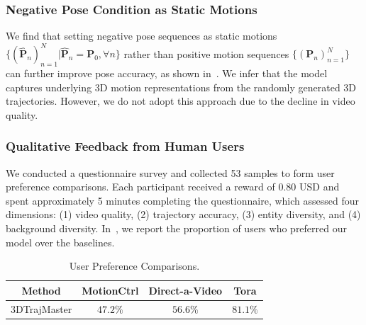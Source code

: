 



\subsubsection{Negative Pose Condition as Static Motions} \label{subsec:negpose}

We find that setting negative pose sequences as static motions $\{(\hat{\mathbf{P}}_n)_{n=1}^N|\hat{\mathbf{P}}_n=\mathbf{P}_0,\forall n\}$ rather than positive motion sequences $\{(\mathbf{P}_n)_{n=1}^N\}$ can further improve pose accuracy, as shown in~. We infer that the model captures underlying 3D motion representations from the randomly generated 3D trajectories. However, we do not adopt this approach due to the decline in video quality.



\subsubsection{Qualitative Feedback from Human Users}

We conducted a questionnaire survey and collected 53 samples to form user preference comparisons. Each participant received a reward of 0.80 USD and spent approximately 5 minutes completing the questionnaire, which assessed four dimensions: (1) video quality, (2) trajectory accuracy, (3) entity diversity, and (4) background diversity. In~, we report the proportion of users who preferred our model over the baselines.

\begin{table}[!ht]

\caption{User Preference Comparisons.}
\label{tab:user_study}

\centering
\begin{threeparttable}
\resizebox{.57\textwidth}{!} 
{
\begin{tabular}{c|c|c|c}
\toprule
Method & MotionCtrl & Direct-a-Video &  Tora \\
\midrule 3DTrajMaster & $47.2 \%$ & $56.6 \%$ & $81.1 \%$ \\
\bottomrule
\end{tabular}
}

\end{threeparttable}
\end{table}



